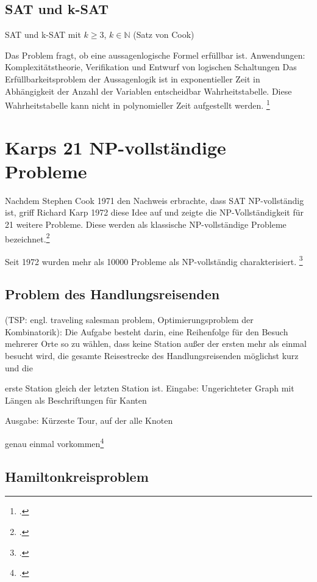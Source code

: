 \documentclass{lehramt-informatik-haupt}
\begin{document}
\subsection{SAT und k-SAT}

SAT und k-SAT mit $k \geq 3$, $k \in \mathbb{N}$ (Satz von Cook)

Das Problem fragt, ob eine aussagenlogische Formel erfüllbar ist.
Anwendungen: Komplexitätstheorie, Verifikation und Entwurf von logischen
Schaltungen Das Erfüllbarkeitsproblem der Aussagenlogik ist in
exponentieller Zeit in Abhängigkeit der Anzahl der Variablen
entscheidbar Wahrheitstabelle. Diese Wahrheitstabelle kann nicht in
polynomieller Zeit aufgestellt werden.
\footcite[Seite 71]{theo:fs:4}

\section{Karps 21 NP-vollständige Probleme}

Nachdem Stephen Cook 1971 den Nachweis erbrachte, dass SAT
NP-vollständig ist, griff Richard Karp 1972 diese Idee auf und zeigte
die NP-Vollständigkeit für 21 weitere Probleme. Diese werden als
klassische NP-vollständige Probleme bezeichnet.\footcite{wiki:karps-21}

Seit 1972 wurden mehr als 10000 Probleme als NP-vollständig
charakterisiert.
\footcite[Seite 80]{theo:fs:4}

%

\subsection{Problem des Handlungsreisenden}

(TSP: engl. traveling salesman problem, Optimierungsproblem der
Kombinatorik): Die Aufgabe besteht darin, eine Reihenfolge für den
Besuch mehrerer Orte so zu wählen, dass keine Station außer der ersten
mehr als einmal besucht wird, die gesamte Reisestrecke des
Handlungsreisenden möglichst kurz und die

erste Station gleich der letzten Station ist. Eingabe: Ungerichteter
Graph mit Längen als Beschriftungen für Kanten

Ausgabe: Kürzeste Tour, auf der alle Knoten

genau einmal vorkommen\footcite[Seite 73]{theo:fs:4}

%

\subsection{Hamiltonkreisproblem}
\end{document}
